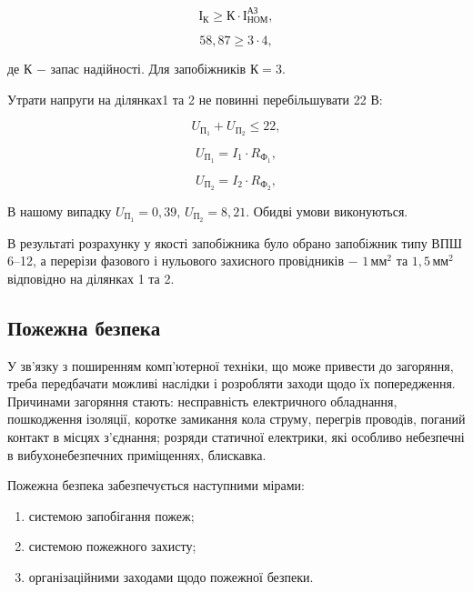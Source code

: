 \[
	\text{І}_{\text{К}} \ge \text{К} \cdot \text{І}^{\text{АЗ}}_{\text{НОМ}},
\]

\[
	58,87 \ge 3 \cdot 4,
\]

\noindent де $\text{К}$ $-$ запас надійності. Для запобіжників $\text{К} = 3$.

\vspace{1.5em}

Утрати напруги на ділянках1 та 2 не повинні перебільшувати 22 В:

\begin{equation}\label{eq:work15}
	U_{\text{П}_{1}} + U_{\text{П}_{2}} \le 22,
\end{equation}

\begin{equation}\label{eq:work16}
	U_{\text{П}_{1}} = I_{1} \cdot R_{\text{Ф}_{1}},
\end{equation}

\begin{equation}\label{eq:work17}
	U_{\text{П}_{2}} = I_{2} \cdot R_{\text{Ф}_{2}},
\end{equation}

\vspace{1.5em}

В нашому випадку $U_{\text{П}_{1}} = 0,39, \, U_{\text{П}_{2}} = 8,21.$ Обидві умови виконуються.

В результаті розрахунку у якості запобіжника було обрано запобіжник типу ВПШ 6–12, а перерізи фазового і нульового захисного провідників $-$ $1 \, \text{мм}^{2}$ та $1,5 \, \text{мм}^{2}$ відповідно на ділянках 1 та 2.

\vspace{1.5em}

\subsection{Пожежна безпека}

У зв’язку з поширенням комп’ютерної техніки, що може привести до загоряння, треба передбачати можливі наслідки і розробляти заходи щодо їх попередження. Причинами загоряння стають: несправність електричного обладнання, пошкодження ізоляції, коротке замикання кола струму, перегрів проводів, поганий контакт в місцях з’єднання; розряди статичної електрики, які особливо небезпечні в вибухонебезпечних приміщеннях, блискавка.

Пожежна безпека забезпечується наступними мірами:

\begin{enumerate}
	\item системою запобігання пожеж;
	\item системою пожежного захисту;
	\item організаційними заходами щодо пожежної безпеки.
\end{enumerate}

